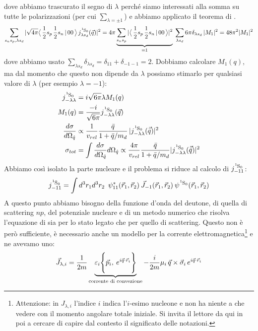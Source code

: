 dove abbiamo trascurato il segno di $\lambda$ perché siamo interessati alla somma su tutte le polarizzazioni (per cui $\sum_{\lambda=\pm 1}$) e abbiamo applicato il teorema di \WE{}.
$$\sum_{s_ns_p,\lambda s_d}|\sqrt{4\pi} \clebs{\frac{1}{2}s_p\,\frac{1}{2}s_n}{00}\, j^{\ce{^1S_0}}_{\lambda s_d} (\vec{q})|^2 = 4\pi \underbrace{\sum_{s_ns_p}|\clebs{\frac{1}{2}s_p\,\frac{1}{2}s_n}{00}|^2}_{=1} \; \sum_{\lambda s_d} 6\pi \delta_{\lambda s_d}\,|M_1|^2 = 48\pi^2 |M_1|^2$$
dove abbiamo usato $\sum_{\lambda s_d}\delta_{\lambda s_d}=\delta_{11} + \delta_{-1-1} =2$. Dobbiamo calcolare $M_1(q)$, ma dal momento che questo non dipende da $\lambda$ possiamo stimarlo per qualsiasi valore di $\lambda$ (per esempio $\lambda = -1$):
\begin{displaymath}
\begin{aligned}
j^{\ce{^1S_0}}_{-\lambda\lambda} &= i \sqrt{6\pi} \lambda M_1(q)\\
M_1(q) &= \frac{-i}{\sqrt{6\pi}} j^{\ce{^1S_0}}_{-\lambda\lambda} (\vec{q}) \\
\frac{d\sigma}{d\Omega_{\hat{q}}} &\propto \frac{1}{v_{rel}} \frac{\bar{q}}{1+\bar{q}/m_d} \, |j^{\ce{^1S_0}}_{-\lambda\lambda}(\vec{\bar{q}})|^2 \\
\sigma_{tot} &= \int \frac{d\sigma}{d\Omega_{\hat{q}}} d\Omega_{\hat{q}} \propto \frac{4\pi}{v_{rel}} \frac{\bar{q}}{1+\bar{q}/m_d} |j^{\ce{^1S_0}}_{-\lambda\lambda}(\vec{\bar{q}})|^2
\end{aligned}
\end{displaymath}
Abbiamo così isolato la parte nucleare e il problema si riduce al calcolo di $j^{\ce{^1S_0}}_{-11}$:
$$j^{\ce{^1S_0}}_{-11} = \int d^3r_1 d^3r_2 \;\: \psi_{11}^*(\vec{r}_1,\vec{r}_2)\: \vec{J}_{-1}(\vec{r}_1,\vec{r}_2)\:\psi^{\ce{^1S_0}}(\vec{r}_1,\vec{r}_2)$$
A questo punto abbiamo bisogno della funzione d'onda del deutone, di quella di scattering $np$, del potenziale nucleare e di un metodo numerico che risolva l'equazione di \Sch{} sia per lo stato legato che per quello di scattering. Questo non è però sufficiente, è necessario anche un modello per la corrente elettromagnetica\footnote{Attenzione: in $J_{\lambda,i}$ l'indice $i$ indica l'$i$-esimo nucleone e non ha niente a che vedere con il momento angolare totale iniziale. Si invita il lettore da qui in poi a cercare di capire dal contesto il significato delle notazioni.} e ne avevamo uno:
$$\vec{J}_{\lambda,i} = \frac{1}{2m} \underbrace{\varepsilon_i \Biggl \{ \vec{p}_i,\:e^{i\vec{q}\cdot\vec{r}_i} \Biggr \}}_\text{corrente di convezione} - \frac{i}{2m} \mu_i \, \vec{q}\times \vec{\sigma}_i\, e^{i\vec{q}\cdot\vec{r}_i}$$
